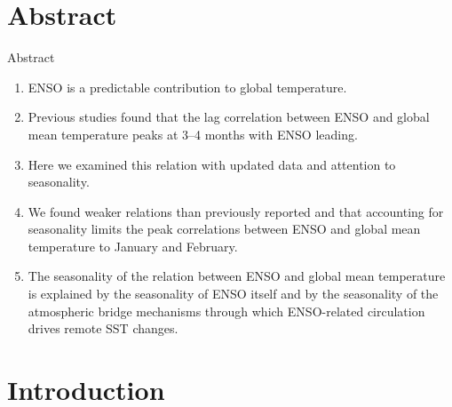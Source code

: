 \documentclass[aspectratio=169,xcolor=dvipsnames]{beamer}
\begin{document}
\section{Abstract}

\begin{frame}{Abstract}
  \begin{enumerate}\scriptsize
  \item ENSO is a predictable contribution to global temperature.
  \item Previous studies found that the lag correlation between ENSO and
    global mean temperature peaks at 3--4 months with ENSO leading.
  \item Here we examined this relation with updated data and attention
    to seasonality.
  \item We found weaker relations than previously reported and that
    accounting for seasonality limits the peak correlations between
    ENSO and global mean temperature to January and February.
  \item The seasonality of the relation between ENSO and global mean
    temperature is explained by the seasonality of ENSO itself and by
    the seasonality of the atmospheric bridge mechanisms through which
    ENSO-related circulation drives remote SST changes.
  \end{enumerate}
\end{frame}

\section{Introduction}
\end{document}
